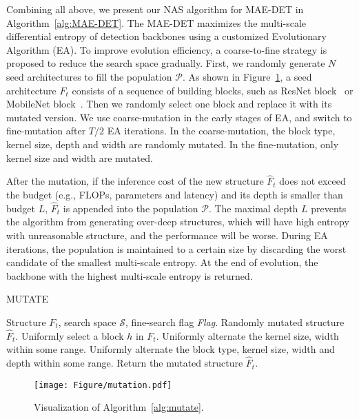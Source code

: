 \documentclass[nohyperref]{article}
\theoremstyle{plain}
\theoremstyle{definition}
\theoremstyle{remark}
\begin{document}
Combining all above, we present our NAS algorithm for MAE-DET in Algorithm~\ref{alg:MAE-DET}. The MAE-DET maximizes the multi-scale differential entropy of detection backbones using a customized Evolutionary Algorithm (EA). To improve evolution efficiency, a coarse-to-fine strategy is proposed to reduce the search space gradually. First, we randomly generate $N$ seed architectures to fill the population $\mathcal{P}$. As shown in Figure~\ref{fig:block}, a seed architecture $F_t$ consists of a sequence of building blocks, such as ResNet block~\citep{resnet} or MobileNet block~\citep{mbv2}. Then we randomly select one block and replace it with its mutated version. We use coarse-mutation in the early stages of EA, and switch to fine-mutation after $T/2$ EA iterations.  In the coarse-mutation, the block type, kernel size, depth and width are randomly mutated. In the fine-mutation, only kernel size and width are mutated.

After the mutation, if the inference cost of the new structure $\hat{F}_t$ does not exceed the budget (e.g., FLOPs, parameters and latency) and its depth is smaller than budget $L$, $\hat{F}_t$ is appended into the population $\mathcal{P}$. The maximal depth $L$ prevents the algorithm from generating over-deep structures, which will have high entropy with unreasonable structure, and the performance will be worse. During EA iterations, the population is maintained to a certain size by discarding the worst candidate of the smallest multi-scale entropy. At the end of evolution, the backbone with the highest multi-scale entropy is returned.

\begin{algorithm}[H]
	\caption{MUTATE}
	\label{alg:mutate}
	\begin{algorithmic}[1]
		\REQUIRE Structure $F_t$, search space $\mathcal{S}$, fine-search flag \textit{Flag}. 
		\ENSURE Randomly mutated structure $\hat{F}_t$.
		\STATE Uniformly select a block $h$ in $F_t$.
		\STATE Uniformly alternate the kernel size, width within some range.
		\ELSE
		\STATE Uniformly alternate the block type, kernel size, width and depth within some range.
		\ENDIF
		\STATE Return the mutated structure $\hat{F}_t$.
	\end{algorithmic}
\end{algorithm}

\begin{figure}[H]
	\centering
	\vspace{-0.5cm}
	\texttt{[image: Figure/mutation.pdf]}			
	\caption{Visualization of Algorithm~\ref{alg:mutate}.}
	\label{fig:block}			
\end{figure}
\end{document}

